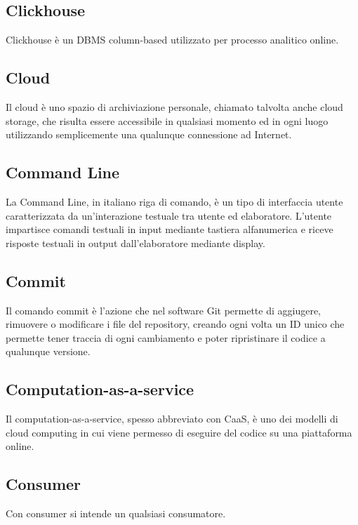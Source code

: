 \subsection*{Clickhouse}
Clickhouse è un DBMS column-based utilizzato per processo analitico online.

\subsection*{Cloud}
Il cloud è uno spazio di archiviazione personale, chiamato talvolta anche cloud storage, che risulta essere accessibile in qualsiasi momento ed in ogni luogo utilizzando semplicemente una qualunque connessione ad Internet.

\subsection*{Command Line}
La Command Line, in italiano riga di comando, è un tipo di interfaccia utente caratterizzata da un'interazione testuale tra utente ed elaboratore. L'utente impartisce comandi testuali in input mediante tastiera alfanumerica e riceve risposte testuali in output dall'elaboratore mediante display.

\subsection*{Commit}
Il comando commit è l'azione che nel software Git permette di aggiugere, rimuovere o modificare i file del repository, creando ogni volta un ID unico che permette tener traccia di ogni cambiamento e poter ripristinare il codice a qualunque versione.

\subsection*{Computation-as-a-service}
Il computation-as-a-service, spesso abbreviato con CaaS, è uno dei modelli di cloud computing in cui viene permesso di eseguire del codice su una piattaforma online.

\subsection*{Consumer}
Con consumer si intende un qualsiasi consumatore.

